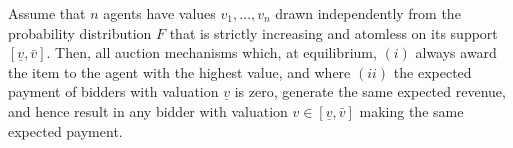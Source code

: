 %
%
%
%

\begin{theorem}
\label{thm:auc:revenue}
Assume that $n$ agents have values $v_1,\dots,v_n$ drawn independently from the probability distribution $F$ that is strictly increasing and atomless on its support $[\underline{v},\bar{v}]$. Then, all auction mechanisms which, at equilibrium, $(i)$ always award the item to the agent with the highest value, and where $(ii)$ the expected payment of bidders with valuation $\underline{v}$ is zero, generate the same expected revenue, and hence result in any bidder with valuation $v \in [\underline{v},\bar{v}]$ making the same expected payment.
\end{theorem}

